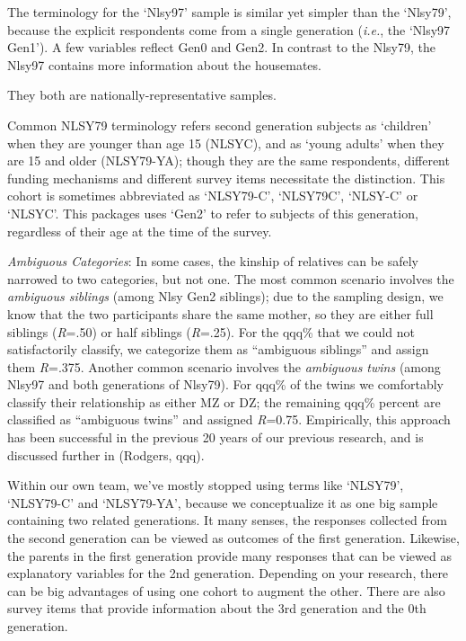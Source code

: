 \documentclass[smallextended]{svjour3}       %
\begin{document}
The terminology for the `Nlsy97' sample is similar yet simpler than the
`Nlsy79', because the explicit respondents come from a single generation
(\emph{i.e.}, the `Nlsy97 Gen1'). A few variables reflect Gen0 and Gen2.
In contrast to the Nlsy79, the Nlsy97 contains more information about
the housemates.

They both are nationally-representative samples.

Common NLSY79 terminology refers second generation subjects as
`children' when they are younger than age 15 (NLSYC), and as `young
adults' when they are 15 and older (NLSY79-YA); though they are the same
respondents, different funding mechanisms and different survey items
necessitate the distinction. This cohort is sometimes abbreviated as
`NLSY79-C', `NLSY79C', `NLSY-C' or `NLSYC'. This packages uses `Gen2' to
refer to subjects of this generation, regardless of their age at the
time of the survey.

\emph{Ambiguous Categories}: In some cases, the kinship of relatives can
be safely narrowed to two categories, but not one. The most common
scenario involves the \emph{ambiguous siblings} (among Nlsy Gen2
siblings); due to the sampling design, we know that the two participants
share the same mother, so they are either full siblings (\emph{R}=.50)
or half siblings (\emph{R}=.25). For the qqq\% that we could not
satisfactorily classify, we categorize them as ``ambiguous siblings''
and assign them \emph{R}=.375. Another common scenario involves the
\emph{ambiguous twins} (among Nlsy97 and both generations of Nlsy79).
For qqq\% of the twins we comfortably classify their relationship as
either MZ or DZ; the remaining qqq\% percent are classified as
``ambiguous twins'' and assigned \emph{R}=0.75. Empirically, this
approach has been successful in the previous 20 years of our previous
research, and is discussed further in (Rodgers, qqq).

Within our own team, we've mostly stopped using terms like `NLSY79',
`NLSY79-C' and `NLSY79-YA', because we conceptualize it as one big
sample containing two related generations. It many senses, the responses
collected from the second generation can be viewed as outcomes of the
first generation. Likewise, the parents in the first generation provide
many responses that can be viewed as explanatory variables for the 2nd
generation. Depending on your research, there can be big advantages of
using one cohort to augment the other. There are also survey items that
provide information about the 3rd generation and the 0th generation.
\end{document}
